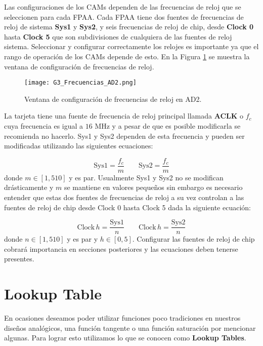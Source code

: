 	Las configuraciones de los CAMs dependen de las frecuencias de reloj que se seleccionen para cada FPAA. Cada FPAA tiene dos fuentes de frecuencias de reloj de sistema \textbf{Sys1} y \textbf{Sys2}, y seis frecuencias de reloj de chip, desde \textbf{Clock 0} hasta \textbf{Clock 5} que son subdivisiones de cualquiera de las fuentes de reloj sistema. Seleccionar y configurar correctamente los relojes es importante ya que el rango de operación de los CAMs depende de esto.  En la Figura \ref{fig:G3_Frecuencias_AD2} se muestra la ventana de configuración de frecuencias de reloj.
	
	\begin{figure}[!ht] 
		\caption{Ventana de configuración de frecuencias de reloj en AD2.}
		\label{fig:G3_Frecuencias_AD2}
		\centering
		\texttt{[image: G3\_Frecuencias\_AD2.png]}
	\end{figure}

	La tarjeta tiene una fuente de frecuencia de reloj principal llamada \textbf{ACLK} o $f_{c}$ cuya frecuencia es igual a $16$ MHz y a pesar de que es posible modificarla se recomienda no hacerlo. Sys1 y Sys2 dependen de esta frecuencia y pueden ser modificadas utilizando las siguientes ecuaciones:

	\begin{equation}
		\mathrm{Sys1} = \frac{f_{c}}{m} \qquad \mathrm{Sys2} = \frac{f_{c}}{m}
		\label{ec:sys_clock}
	\end{equation}
	donde $m\in [1,510]$ y es par. Usualmente Sys1 y Sys2 no se modifican drásticamente y $m$ se mantiene en valores pequeños sin embargo es necesario entender que estas dos fuentes de frecuencias de reloj a su vez controlan a las fuentes de reloj de chip desde Clock 0 hasta Clock 5 dada la siguiente ecuación:

	\begin{equation}
		\mathrm{Clock\,} h = \frac{\mathrm{Sys1}}{n}	\qquad   \mathrm{Clock\,} h = \frac{\mathrm{Sys2}}{n}
		\label{ec:clock_h}
	\end{equation}
	donde $n\in[1,510]$ y es par y $h\in[0,5]$. Configurar las fuentes de reloj de chip cobrará importancia en secciones posteriores y las ecuaciones deben tenerse presentes.

	\section{Lookup Table}
	
	En ocasiones deseamos poder utilizar funciones poco tradiciones en nuestros diseños analógicos, una función tangente o una función saturación por mencionar algunas. Para lograr esto utilizamos lo que se conocen como \textbf{Lookup Tables}.
		
